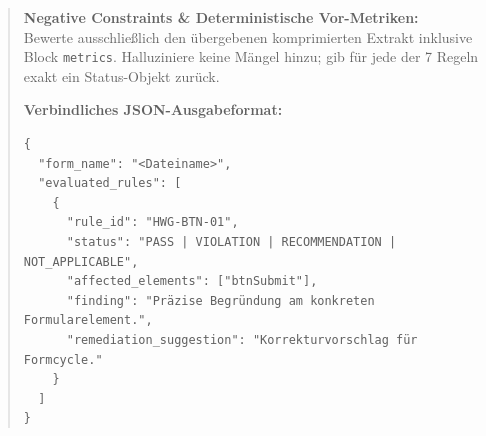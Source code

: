 \begin{quote}
\vspace{0.15cm}
\textbf{Negative Constraints \& Deterministische Vor-Metriken:} \\
Bewerte ausschließlich den übergebenen komprimierten Extrakt inklusive Block \texttt{metrics}. Halluziniere keine Mängel hinzu; gib für jede der 7 Regeln exakt ein Status-Objekt zurück.

\vspace{0.15cm}
\textbf{Verbindliches JSON-Ausgabeformat:}
\begin{verbatim}
{
  "form_name": "<Dateiname>",
  "evaluated_rules": [
    {
      "rule_id": "HWG-BTN-01",
      "status": "PASS | VIOLATION | RECOMMENDATION | NOT_APPLICABLE",
      "affected_elements": ["btnSubmit"],
      "finding": "Präzise Begründung am konkreten Formularelement.",
      "remediation_suggestion": "Korrekturvorschlag für Formcycle."
    }
  ]
}
\end{verbatim}
\end{quote}
